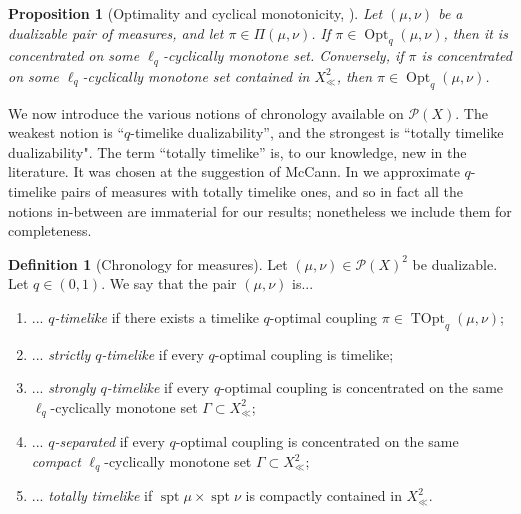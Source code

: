 \documentclass{article}
\DeclareMathOperator{\spt}{spt}
\newcommand{\Pcal}{\mathcal{P}}
\DeclareMathOperator{\Opt}{Opt}
\DeclareMathOperator{\TOpt}{TOpt}
\newtheorem{prop}[theorem]{Proposition}
\theoremstyle{definition}
\newtheorem{defn}{Definition}[section]
\begin{document}
{\begin{prop}[Optimality and cyclical monotonicity, ]\label{cyclicallymonotoneoptimal} Let $(\mu,\nu)$ be a dualizable pair of measures, and let $\pi\in \Pi(\mu, \nu)$. If $\pi\in \Opt_q(\mu,\nu)$, then it is concentrated on some $\ell_q$-cyclically monotone set. Conversely, if $\pi$ is concentrated on some $\ell_q$-cyclically monotone set contained in $X_\ll^2$, then $\pi\in\Opt_q(\mu,\nu)$. 
\end{prop}
We now introduce the various notions of chronology available on $\Pcal(X)$. The weakest notion is ``$q$-timelike dualizability'', and the strongest is ``totally timelike dualizability". The term ``totally timelike'' is, to our knowledge, new in the literature. It was chosen at the suggestion of McCann. In  we approximate $q$-timelike pairs of measures with totally timelike ones, and so in fact all the notions in-between are immaterial for our results; nonetheless we include them for completeness.

\begin{defn}[Chronology for measures]\label{chronologynotions} Let $(\mu,\nu)\in\Pcal(X)^2$ be dualizable. Let $q\in (0,1)$. We say that the pair $(\mu,\nu)$ is... 
\begin{enumerate}
\item ... {\it $q$-timelike} if there exists a timelike $q$-optimal coupling $\pi\in \TOpt_q(\mu,\nu)$;
\item ...  {\it strictly $q$-timelike} if every $q$-optimal coupling is timelike; 
\item ... {\it strongly $q$-timelike} if every $q$-optimal coupling is concentrated on the same $\ell_q$-cyclically monotone set $\Gamma\subset X_\ll^2$;
\item ... {\it $q$-separated} if  every $q$-optimal coupling is concentrated on the same {\it compact} $\ell_q$-cyclically monotone set $\Gamma\subset X_\ll^2$; 
\item ... {\it totally timelike} if $\spt\mu\times \spt\nu$ is compactly contained in $X_\ll^2$. 
\end{enumerate}
\end{defn}

}
\end{document}

